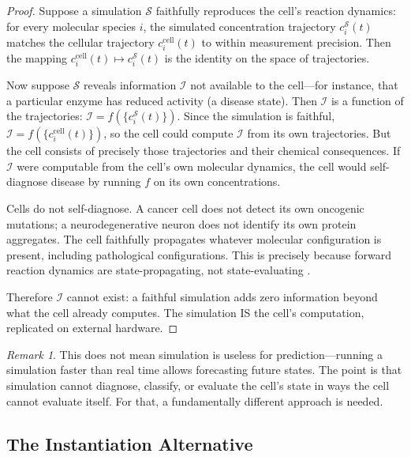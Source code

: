 \documentclass[twocolumn,10pt,a4paper]{article}
\theoremstyle{definition}
\theoremstyle{remark}
\newtheorem{remark}[theorem]{Remark}
\begin{document}
\begin{proof}
Suppose a simulation $\mathcal{S}$ faithfully reproduces the cell's reaction dynamics: for every molecular species $i$, the simulated concentration trajectory $c_i^{\mathcal{S}}(t)$ matches the cellular trajectory $c_i^{\mathrm{cell}}(t)$ to within measurement precision. Then the mapping $c_i^{\mathrm{cell}}(t) \mapsto c_i^{\mathcal{S}}(t)$ is the identity on the space of trajectories.

Now suppose $\mathcal{S}$ reveals information $\mathcal{I}$ not available to the cell---for instance, that a particular enzyme has reduced activity (a disease state). Then $\mathcal{I}$ is a function of the trajectories: $\mathcal{I} = f(\{c_i^{\mathcal{S}}(t)\})$. Since the simulation is faithful, $\mathcal{I} = f(\{c_i^{\mathrm{cell}}(t)\})$, so the cell could compute $\mathcal{I}$ from its own trajectories. But the cell consists of precisely those trajectories and their chemical consequences. If $\mathcal{I}$ were computable from the cell's own molecular dynamics, the cell would self-diagnose disease by running $f$ on its own concentrations.

Cells do not self-diagnose. A cancer cell does not detect its own oncogenic mutations; a neurodegenerative neuron does not identify its own protein aggregates. The cell faithfully propagates whatever molecular configuration is present, including pathological configurations. This is precisely because forward reaction dynamics are state-propagating, not state-evaluating \citep{Rosen1991}.

Therefore $\mathcal{I}$ cannot exist: a faithful simulation adds zero information beyond what the cell already computes. The simulation IS the cell's computation, replicated on external hardware.
\end{proof}

\begin{remark}
This does not mean simulation is useless for prediction---running a simulation faster than real time allows forecasting future states. The point is that simulation cannot diagnose, classify, or evaluate the cell's state in ways the cell cannot evaluate itself. For that, a fundamentally different approach is needed.
\end{remark}

\subsection{The Instantiation Alternative}
\end{document}
